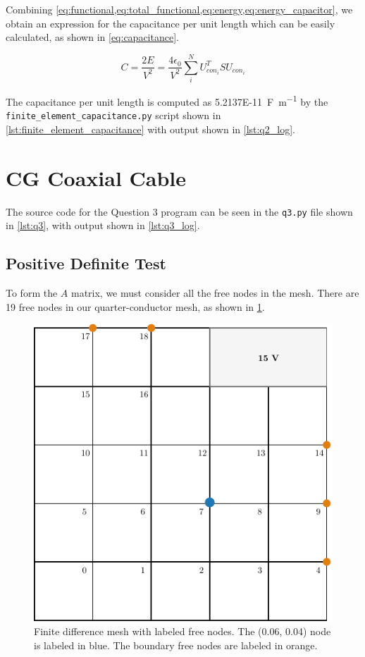 \documentclass[a4paper,titlepage]{article}
\begin{document}
	Combining \cref{eq:functional,eq:total_functional,eq:energy,eq:energy_capacitor}, we obtain an expression for the capacitance per unit length which can be easily calculated, as shown in \autoref{eq:capacitance}.
	
	\begin{equation} \label{eq:capacitance}
		C = \frac{2E}{V^2} = \frac{4 \epsilon_0}{V^2} \sum_{i}^{N}{U_{con_i}^T S U_{con_i}}
	\end{equation}
	
	The capacitance per unit length is computed as \SI{5.2137E-11}{\farad\per\meter} by the \texttt{finite_element_capacitance.py} script shown in \cref{lst:finite_element_capacitance} with output shown in \cref{lst:q2_log}.
	
	\section{CG Coaxial Cable}
	
	The source code for the Question 3 program can be seen in the \texttt{q3.py} file shown in \cref{lst:q3}, with output shown in \cref{lst:q3_log}.
	
	\subsection{Positive Definite Test}
	
	To form the $A$ matrix, we must consider all the free nodes in the mesh. There are 19 free nodes in our quarter-conductor mesh, as shown in \cref{fig:finite_difference_mesh}.
	
	\begin{figure}[!htb]
		\centering
		\includegraphics[width=\columnwidth]{plots/finite_difference_mesh.pdf}
		\caption
		{Finite difference mesh with labeled free nodes. The (0.06, 0.04) node is labeled in blue. The boundary free nodes are labeled in orange.}
		\label{fig:finite_difference_mesh}
	\end{figure}
	
\end{document}
